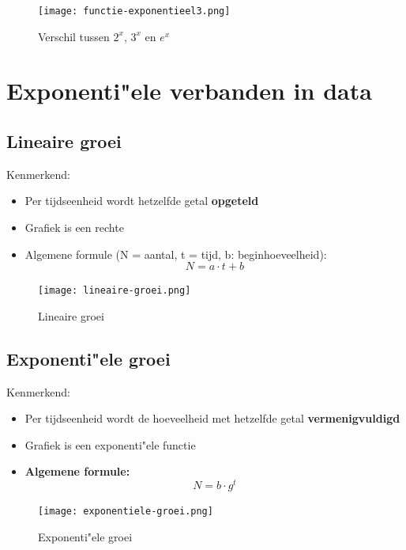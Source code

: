 \documentclass{article}
\begin{document}
\begin{figure}[H]
    \centering
    \texttt{[image: functie-exponentieel3.png]}
    \caption{Verschil tussen $2^x$, $3^x$ en $e^x$}
\end{figure}

\section{Exponenti"ele verbanden in data}

\subsection{Lineaire groei}

Kenmerkend:

\begin{itemize}
    \item Per tijdseenheid wordt hetzelfde getal \textbf{opgeteld}
    \item Grafiek is een rechte
    \item Algemene formule (N = aantal, t = tijd, b: beginhoeveelheid): 
    \begin{equation}
        N = a\cdot t + b
    \end{equation}
\end{itemize}

\begin{figure}[H]
    \centering
    \texttt{[image: lineaire-groei.png]}
    \caption{Lineaire groei}
\end{figure}

\subsection{Exponenti"ele groei}

Kenmerkend: 

\begin{itemize}
    \item Per tijdseenheid wordt de hoeveelheid met hetzelfde getal \textbf{vermenigvuldigd}
    \item Grafiek is een exponenti"ele functie
    \item \textbf{Algemene formule:} 
    \begin{equation}
        N = b \cdot g^t
    \end{equation}
\end{itemize}

\begin{figure}[H]
    \centering
    \texttt{[image: exponentiele-groei.png]}
    \caption{Exponenti"ele groei}
\end{figure}
\end{document}
